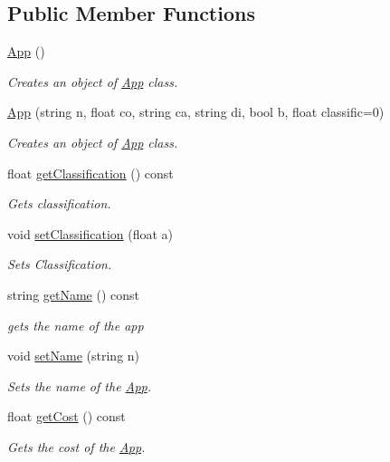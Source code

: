 \subsection*{Public Member Functions}
\begin{DoxyCompactItemize}
\item 
\hyperlink{class_app_acb8cbf3e285b91d0170ffe87df5989c5}{App} ()
\begin{DoxyCompactList}\small\item\em Creates an object of \hyperlink{class_app}{App} class. \end{DoxyCompactList}\item 
\hyperlink{class_app_aa3731a04a7b0acb38a20babef71be4b2}{App} (string n, float co, string ca, string di, bool b, float classific=0)
\begin{DoxyCompactList}\small\item\em Creates an object of \hyperlink{class_app}{App} class. \end{DoxyCompactList}\item 
float \hyperlink{class_app_a9ca40e442fead18c4912c043bb3eec0c}{get\-Classification} () const 
\begin{DoxyCompactList}\small\item\em Gets classification. \end{DoxyCompactList}\item 
void \hyperlink{class_app_a175d65b6341257216b3b366d12623f40}{set\-Classification} (float a)
\begin{DoxyCompactList}\small\item\em Sets Classification. \end{DoxyCompactList}\item 
string \hyperlink{class_app_a32eb5fb345735dd5545e31e540b00969}{get\-Name} () const 
\begin{DoxyCompactList}\small\item\em gets the name of the app \end{DoxyCompactList}\item 
void \hyperlink{class_app_a960a18b2a0582166cff18b11e6572607}{set\-Name} (string n)
\begin{DoxyCompactList}\small\item\em Sets the name of the \hyperlink{class_app}{App}. \end{DoxyCompactList}\item 
float \hyperlink{class_app_a59d402c9a9f578f0c031bbee0c029d8a}{get\-Cost} () const 
\begin{DoxyCompactList}\small\item\em Gets the cost of the \hyperlink{class_app}{App}. \end{DoxyCompactList}\item 

\end{DoxyCompactItemize}
